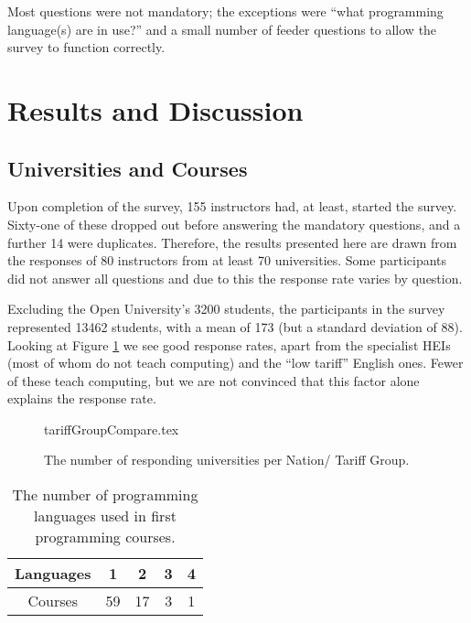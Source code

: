 \documentclass{sig-alternate}
\begin{document}
Most questions were not mandatory; the exceptions were ``what programming language(s) are in use?'' and a small number of feeder questions to allow the survey to function correctly.

\section{Results and Discussion}\label{results}

\subsection{Universities and Courses}
Upon completion of the survey, 155 instructors had, at least, started the survey. Sixty-one of these dropped out before answering the mandatory questions, and a further 14 were duplicates. Therefore, the results presented here are drawn from the responses of 80 instructors from at least 70 universities. Some participants did not answer all questions and due to this the response rate varies by question.

Excluding the Open University's 3200 students, the participants in the survey represented 13462 students, with a mean of 173 (but a standard deviation of 88). Looking at Figure \ref{fig:TG} we see good response rates, apart from the specialist HEIs (most of whom do not teach computing) and the ``low tariff'' English ones. Fewer of these teach computing, %
but we are not convinced that this factor alone explains the response rate.
\begin{figure}
\begin{center}
{tariffGroupCompare.tex}\vskip-12pt
\caption{The number of responding universities per Nation/   
 Tariff Group.\label{fig:TG}}
\end{center}
\end{figure}

\begin{table}[]
\centering
\caption{The number of programming languages used in first programming courses.}
\label{tab:numLanguages}
\begin{tabular}{ccccc}
\hline
Languages & 1  & 2  & 3 & 4 \\ \hline
Courses   & 59 & 17 & 3 & 1 \\ \hline
\end{tabular}
\end{table}
\end{document}
